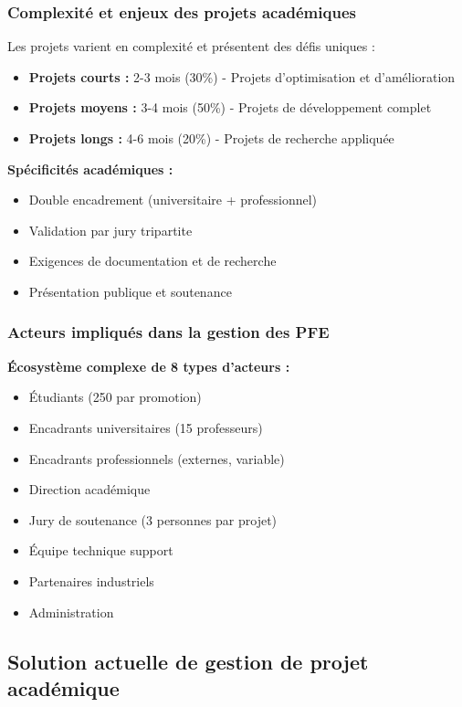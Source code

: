 \subsubsection{Complexité et enjeux des projets académiques}
Les projets varient en complexité et présentent des défis uniques :
\begin{itemize}
    \item \textbf{Projets courts :} 2-3 mois (30\%) - Projets d'optimisation et d'amélioration
    \item \textbf{Projets moyens :} 3-4 mois (50\%) - Projets de développement complet
    \item \textbf{Projets longs :} 4-6 mois (20\%) - Projets de recherche appliquée
\end{itemize}

\textbf{Spécificités académiques :}
\begin{itemize}
    \item Double encadrement (universitaire + professionnel)
    \item Validation par jury tripartite
    \item Exigences de documentation et de recherche
    \item Présentation publique et soutenance
\end{itemize}

\subsubsection{Acteurs impliqués dans la gestion des PFE}
\textbf{Écosystème complexe de 8 types d'acteurs :}
\begin{itemize}
    \item Étudiants (250 par promotion)
    \item Encadrants universitaires (15 professeurs)
    \item Encadrants professionnels (externes, variable)
    \item Direction académique
    \item Jury de soutenance (3 personnes par projet)
    \item Équipe technique support
    \item Partenaires industriels
    \item Administration
\end{itemize}

\subsection{Solution actuelle de gestion de projet académique}

